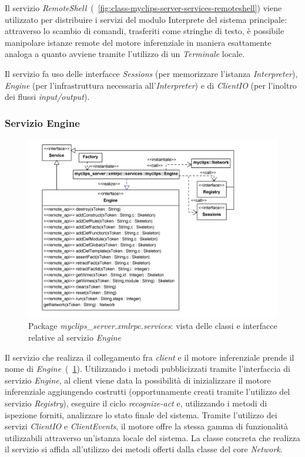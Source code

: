 Il servizio \emph{RemoteShell}~(\figurename~\ref{fig:class-myclips-server-services-remoteshell}) viene utilizzato per distribuire i servizi del modulo Interprete del sistema principale: attraverso lo scambio di comandi, trasferiti come stringhe di testo, è possibile manipolare istanze remote del motore inferenziale in maniera esattamente analoga a quanto avviene tramite l'utilizzo di un \emph{Terminale} locale.

Il servizio fa uso delle interfacce \emph{Sessions} (per memorizzare l'istanza \emph{Interpreter}), \emph{Engine} (per l'infrastruttura necessaria all'\emph{Interpreter}) e di \emph{ClientIO} (per l'inoltro dei flussi \emph{input/output}).

\subsubsection{Servizio Engine}

\begin{figure}[h]
\centering
\includegraphics[width=1\textwidth]{Immagini/Capitolo3/Classi/myclips_server_services_Engine.png}
\caption{Package \emph{myclips\_server.xmlrpc.services}: vista delle classi e interfacce relative al servizio \emph{Engine}}\label{fig:class-myclips-server-services-engine}
\end{figure}

Il servizio che realizza il collegamento fra \emph{client} e il motore inferenziale prende il nome di \emph{Engine}~(\figurename~\ref{fig:class-myclips-server-services-engine}). Utilizzando i metodi pubblicizzati tramite l'interfaccia di servizio \emph{Engine}, al client viene data la possibilità di inizializzare il motore inferenziale aggiungendo costrutti (opportunamente creati tramite l'utilizzo del servizio \emph{Registry}), eseguire il ciclo \emph{recognize-act} e, utilizzando i metodi di ispezione forniti, analizzare lo stato finale del sistema. Tramite l'utilizzo dei servizi \emph{ClientIO} e \emph{ClientEvents}, il motore offre la stessa gamma di funzionalità utilizzabili attraverso un'istanza locale del sistema. La classe concreta che realizza il servizio si affida all'utilizzo dei metodi offerti dalla classe del core \emph{Network}.

